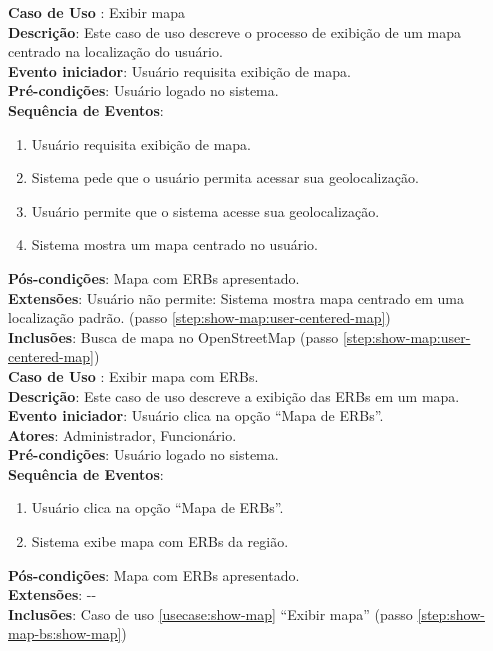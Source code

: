 \documentclass[]{politex}
\begin{document}
\noindent \textbf{Caso de Uso }: Exibir mapa \\
\textbf{Descrição}: Este caso de uso descreve o processo de exibição de um mapa
centrado na localização do usuário. \\
\textbf{Evento iniciador}: Usuário requisita exibição de mapa. \\
\textbf{Pré-condições}: Usuário logado no sistema. \\
\textbf{Sequência de Eventos}:
\begin{enumerate}
\item Usuário requisita exibição de mapa.
\item Sistema pede que o usuário permita acessar sua geolocalização.
\item Usuário permite que o sistema acesse sua geolocalização.
\item\label{step:show-map:user-centered-map} Sistema mostra um mapa centrado no
usuário.
\end{enumerate}
\textbf{Pós-condições}: Mapa com ERBs apresentado. \\
\textbf{Extensões}: Usuário não permite: Sistema mostra mapa centrado em uma
localização padrão. (passo \ref{step:show-map:user-centered-map}) \\
\textbf{Inclusões}: Busca de mapa no OpenStreetMap (passo
\ref{step:show-map:user-centered-map}) \\

\noindent \textbf{Caso de Uso }: Exibir mapa com ERBs. \\
\textbf{Descrição}: Este caso de uso descreve a exibição das ERBs em um mapa. \\
\textbf{Evento iniciador}: Usuário clica na opção ``Mapa de ERBs''. \\
\textbf{Atores}: Administrador, Funcionário. \\
\textbf{Pré-condições}: Usuário logado no sistema. \\
\textbf{Sequência de Eventos}:
\begin{enumerate}
\item Usuário clica na opção ``Mapa de ERBs''.
\item\label{step:show-map-bs:show-map} Sistema exibe mapa com ERBs da região.
\end{enumerate}
\textbf{Pós-condições}: Mapa com ERBs apresentado. \\
\textbf{Extensões}: -{}- \\
\textbf{Inclusões}: Caso de uso \ref{usecase:show-map} ``Exibir mapa'' (passo
\ref{step:show-map-bs:show-map}) \\
\end{document}
